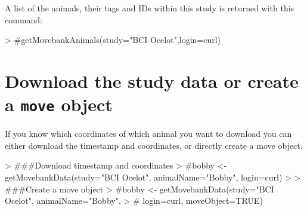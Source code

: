 \documentclass[article,nojss]{jss}
\begin{document}
A list of the animals, their tags and IDs within this study is returned with this command:

\begin{Schunk}
\begin{Sinput}
> #getMovebankAnimals(study="BCI Ocelot",login=curl)
\end{Sinput}
\end{Schunk}


\section*{Download the study data or create a \texttt{move} object}
If you know which coordinates of which animal you want to download you can either download the timestamp and coordinates, or directly create a move object. 

\begin{Schunk}
\begin{Sinput}
> ###Download timestamp and coordinates
> #bobby <- getMovebankData(study="BCI Ocelot", animalName="Bobby", login=curl)
> 
> ###Create a move object
> #bobby <- getMovebankData(study="BCI Ocelot", animalName="Bobby", 
> #                                               login=curl, moveObject=TRUE)
\end{Sinput}
\end{Schunk}
\end{document}
